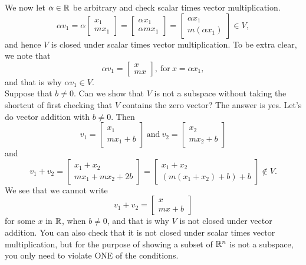 We now let $\alpha \in \mathbb R$ be arbitrary and check scalar times vector multiplication.
$$\alpha v_1= \alpha \begin{bmatrix} x_1  \\ m x_1  \end{bmatrix}=\begin{bmatrix} \alpha x_1 \\ \alpha m x_1 \end{bmatrix} = \begin{bmatrix} \alpha x_1 \\ m ( \alpha  x_1) \end{bmatrix} \in V,$$
and hence $V$ is closed under  scalar times vector multiplication. To be extra clear, we note that
$$\alpha v_1 = \begin{bmatrix} x \\ m x \end{bmatrix}, ~\text{for}~x=\alpha x_1,$$
and that is why $\alpha v_1 \in V.$\\

Suppose that $b\ne 0$. Can we show that $V$ is not a subspace without taking the shortcut of first checking that $V$ contains the zero vector? The answer is yes. Let's do vector addition with $b \neq 0$. Then 
$$v_1 = \begin{bmatrix} x_1 \\ m x_1 + b\end{bmatrix}~\text{and}~v_2 = \begin{bmatrix} x_2 \\ m x_2 +b\end{bmatrix} $$
and
$$v_1 + v_2= \begin{bmatrix} x_1 + x_2 \\ m x_1 + m x_2 + 2 b \end{bmatrix}=\begin{bmatrix} x_1 + x_2 \\ \left( m (x_1 + x_2) + b \right) + \boxed{b} \end{bmatrix} \not \in V.$$
We see that we cannot write
$$v_1 + v_2 = \begin{bmatrix} x \\ mx+b \end{bmatrix} $$
for some $x$ in $\mathbb R$, when $b \neq 0$, and that is why $V$ is not closed under vector addition. You can also check that it is not closed under scalar times vector multiplication, but for the purpose of showing a subset of $\mathbb R^n$ is not a subspace, you only need to violate ONE of the conditions.
\Qed

